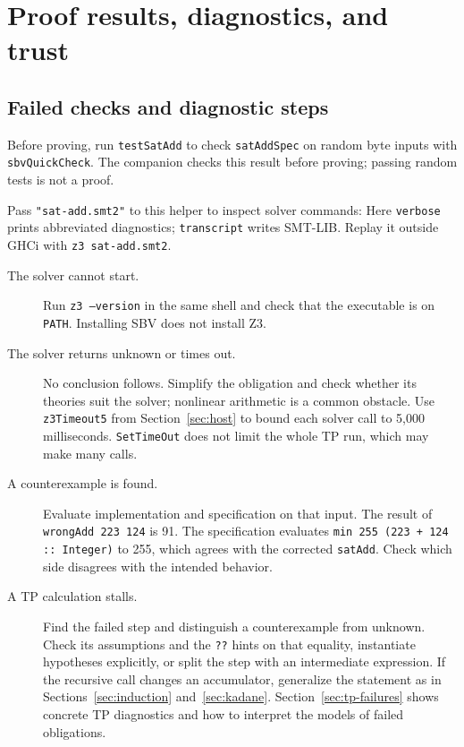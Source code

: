 \documentclass[review]{jfp-epi}
\newcommand{\code}[1]{\texttt{#1}}
\begin{document}
\section{Proof results, diagnostics, and trust}
\label{sec:pitfalls}

\subsection{Failed checks and diagnostic steps}
\label{sec:troubleshooting}

Before proving, run \code{testSatAdd} to check \code{satAddSpec} on random byte
inputs with \code{sbvQuickCheck}. The companion checks this result before proving;
passing random tests is not a proof.

Pass \code{"sat-add.smt2"} to this helper to inspect solver commands:
Here \code{verbose} prints abbreviated diagnostics; \code{transcript} writes
SMT-LIB. Replay it outside GHCi with \code{z3 sat-add.smt2}.

\begin{description}
\item[The solver cannot start.] Run \code{z3 --version} in the same shell and
  check that the executable is on \code{PATH}. Installing SBV does not install Z3.
\item[The solver returns unknown or times out.] No conclusion follows.
  Simplify the obligation and check whether its theories suit the solver;
  nonlinear arithmetic is a common obstacle. Use \code{z3Timeout5} from
  Section~\ref{sec:host} to bound each solver call to 5,000 milliseconds.
  \code{SetTimeOut} does not limit the whole TP run, which may make many calls.
\item[A counterexample is found.] Evaluate implementation and specification on
  that input. The result of \code{wrongAdd 223 124} is 91. The specification
  evaluates \code{min 255 (223 + 124 :: Integer)} to 255, which agrees with
  the corrected \code{satAdd}. Check which side disagrees with the intended behavior.
\item[A TP calculation stalls.] Find the failed step and distinguish a
  counterexample from unknown. Check its assumptions and the \code{??} hints
  on that equality, instantiate hypotheses explicitly, or split the step with
  an intermediate expression. If the recursive call changes an accumulator,
  generalize the statement as in Sections~\ref{sec:induction} and~\ref{sec:kadane}.
  Section~\ref{sec:tp-failures} shows concrete TP diagnostics and how to interpret
  the models of failed obligations.
\end{description}
\end{document}
